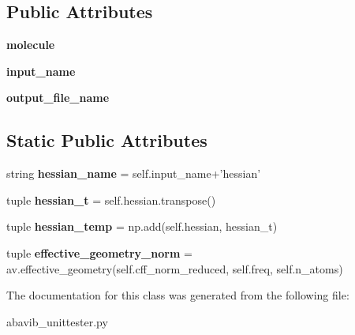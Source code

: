 \subsection*{Public Attributes}
\begin{DoxyCompactItemize}
\item 
\hypertarget{classabavib__unittester_1_1abavib__test_a6fa6ae385313c0c63bef6495beeec8c6}{{\bfseries molecule}}\label{classabavib__unittester_1_1abavib__test_a6fa6ae385313c0c63bef6495beeec8c6}

\item 
\hypertarget{classabavib__unittester_1_1abavib__test_a171cbc7ae0146803b6d9f0aca3d2ef5b}{{\bfseries input\+\_\+name}}\label{classabavib__unittester_1_1abavib__test_a171cbc7ae0146803b6d9f0aca3d2ef5b}

\item 
\hypertarget{classabavib__unittester_1_1abavib__test_a23dc9ba322b89932b6d11fe13ea2e9d0}{{\bfseries output\+\_\+file\+\_\+name}}\label{classabavib__unittester_1_1abavib__test_a23dc9ba322b89932b6d11fe13ea2e9d0}

\end{DoxyCompactItemize}
\subsection*{Static Public Attributes}
\begin{DoxyCompactItemize}
\item 
\hypertarget{classabavib__unittester_1_1abavib__test_aeb333ddfd05135d61cadeead74db8b3c}{string {\bfseries hessian\+\_\+name} = self.\+input\+\_\+name+'hessian'}\label{classabavib__unittester_1_1abavib__test_aeb333ddfd05135d61cadeead74db8b3c}

\item 
\hypertarget{classabavib__unittester_1_1abavib__test_aaa7889805632a7598f00c3ab8b8c4053}{tuple {\bfseries hessian\+\_\+t} = self.\+hessian.\+transpose()}\label{classabavib__unittester_1_1abavib__test_aaa7889805632a7598f00c3ab8b8c4053}

\item 
\hypertarget{classabavib__unittester_1_1abavib__test_ad036d56c040c6b2cd8ac548e0c26c72e}{tuple {\bfseries hessian\+\_\+temp} = np.\+add(self.\+hessian, hessian\+\_\+t)}\label{classabavib__unittester_1_1abavib__test_ad036d56c040c6b2cd8ac548e0c26c72e}

\item 
\hypertarget{classabavib__unittester_1_1abavib__test_aeefde93336cab151eb0bb2c1db4e5bd1}{tuple {\bfseries effective\+\_\+geometry\+\_\+norm} = av.\+effective\+\_\+geometry(self.\+cff\+\_\+norm\+\_\+reduced, self.\+freq, self.\+n\+\_\+atoms)}\label{classabavib__unittester_1_1abavib__test_aeefde93336cab151eb0bb2c1db4e5bd1}

\end{DoxyCompactItemize}


The documentation for this class was generated from the following file\+:\begin{DoxyCompactItemize}
\item 
abavib\+\_\+unittester.\+py\end{DoxyCompactItemize}

